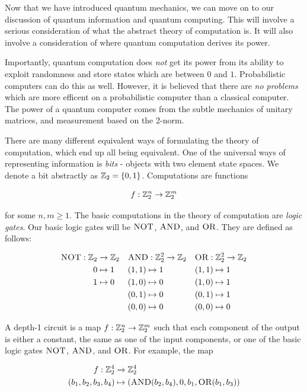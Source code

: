 \documentclass{article}
\theoremstyle{definition}
\numberwithin{figure}{section}
\begin{document}
Now that we have introduced quantum mechanics, we can move on to our discussion of quantum information and quantum computing. This will involve a serious consideration of what the abstract theory of computation is. It will also involve a consideration of where quantum computation derives its power.

Importantly, quantum computation does \textit{not} get its power from its ability to exploit randomness and store states which are between $0$ and $1$. Probabilistic computers can do this as well. However,  it is believed that there are \textit{no problems} which are more efficent on a probabilistic computer than a classical computer. The power of a quantum computer comes from the subtle mechanics of unitary matrices, and measurement based on the 2-norm.

There are many different equivalent ways of formulating the theory of computation, which end up all being equivalent. One of the universal ways of representing information is \textit{bits} - objects with two element state spaces. We denote a bit abstractly as $\mathbb{Z}_2=\{0,1\}$. Computations are functions

$$f:\mathbb{Z}_2^n\to \mathbb{Z}_2^m$$

for some $n,m\geq 1$. The basic computations in the theory of computation are \textit{logic gates}. Our basic logic gates will be $\text{\scshape NOT\normalfont}$, $\text{\scshape AND\normalfont}$, and $\text{\scshape OR\normalfont}$. They are defined as follows:

\begin{align*}
\text{\scshape NOT\normalfont}: \mathbb{Z}_2&\xrightarrow{}\mathbb{Z}_2 && \text{\scshape AND\normalfont}: \mathbb{Z}_2^2\xrightarrow{}\mathbb{Z}_2 && \text{\scshape OR\normalfont}:\mathbb{Z}_2^2\xrightarrow{}\mathbb{Z}_2\\
0&\mapsto 1 && (1,1) \mapsto 1 && (1,1)\mapsto 1\\
1&\mapsto 0 && (1,0)\mapsto 0 && (1,0)\mapsto 1\\
& && (0,1)\mapsto 0 && (0,1)\mapsto 1\\
& && (0,0)\mapsto 0 && (0,0)\mapsto 0\\
\end{align*}

A depth-1 circuit is a map $f:\mathbb{Z}_2^n\to \mathbb{Z}_2^m$ such that each component of the output is either a constant, the same as one of the input components, or one of the basic logic gates $\text{\scshape NOT\normalfont}$, $\text{\scshape AND\normalfont}$, and $\text{\scshape OR\normalfont}$. For example, the map

\begin{align*}
f:\mathbb{Z}_2^4&\xrightarrow{} \mathbb{Z}_2^4\\
(b_1,b_2,b_3,b_4)&\mapsto (\text{\scshape AND\normalfont}(b_2,b_4), 0, b_1, \text{\scshape OR\normalfont}(b_1,b_3))
\end{align*}
\end{document}
